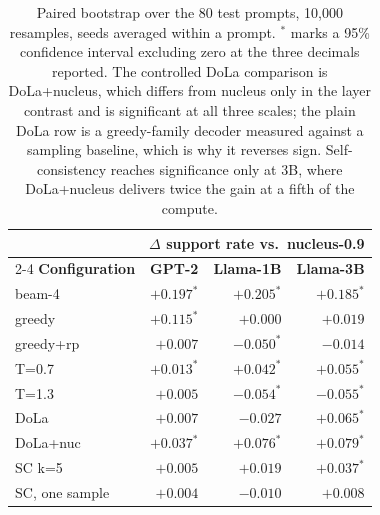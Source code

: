 \begin{table}[t]
  \centering
  \small
  \begin{tabular}{l rrr}
    \toprule
    & \multicolumn{3}{c}{$\Delta$ support rate vs.\ nucleus-0.9} \\
    \cmidrule(lr){2-4}
    \textbf{Configuration} & \textbf{GPT-2} & \textbf{Llama-1B} & \textbf{Llama-3B} \\
    \midrule
    beam-4 & $+0.197^{*}$ & $+0.205^{*}$ & $+0.185^{*}$ \\
    greedy & $+0.115^{*}$ & $+0.000$ & $+0.019$ \\
    greedy+rp & $+0.007$ & $-0.050^{*}$ & $-0.014$ \\
    T=0.7 & $+0.013^{*}$ & $+0.042^{*}$ & $+0.055^{*}$ \\
    T=1.3 & $+0.005$ & $-0.054^{*}$ & $-0.055^{*}$ \\
    DoLa & $+0.007$ & $-0.027$ & $+0.065^{*}$ \\
    DoLa+nuc & $+0.037^{*}$ & $+0.076^{*}$ & $+0.079^{*}$ \\
    SC k=5 & $+0.005$ & $+0.019$ & $+0.037^{*}$ \\
    SC, one sample & $+0.004$ & $-0.010$ & $+0.008$ \\
    \bottomrule
  \end{tabular}
  \caption{Paired bootstrap over the 80 test prompts, 10{,}000 resamples, seeds averaged within a prompt. $^{*}$ marks a 95\% confidence interval excluding zero at the three decimals reported. The controlled DoLa comparison is DoLa+nucleus, which differs from nucleus only in the layer contrast and is significant at all three scales; the plain DoLa row is a greedy-family decoder measured against a sampling baseline, which is why it reverses sign. Self-consistency reaches significance only at 3B, where DoLa+nucleus delivers twice the gain at a fifth of the compute.}
  \label{tab:paired}
\end{table}
